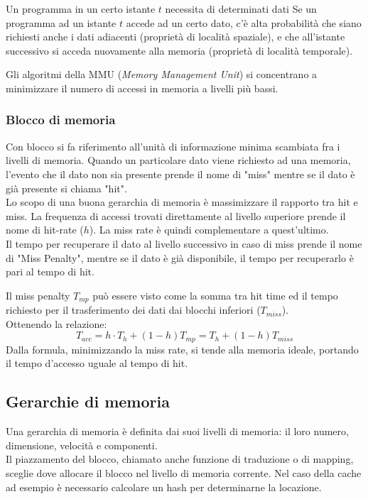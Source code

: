 \documentclass[../template]{subfiles}
\begin{document}
Un programma in un certo istante $t$ necessita di determinati dati
Se un programma ad un istante $t$ accede ad un certo dato,
c'è alta probabilità che siano richiesti anche i dati adiacenti (proprietà di località spaziale), e che all'istante successivo si acceda nuovamente alla memoria (proprietà di località temporale).

Gli algoritmi della MMU (\textit{Memory Management Unit}) si concentrano a minimizzare il numero di accessi in memoria a livelli più bassi.


\subsubsection{Blocco di memoria}
Con blocco si fa riferimento all'unità di informazione minima scambiata fra i livelli di memoria.
Quando un particolare dato viene richiesto ad una memoria, l'evento che il dato non sia presente prende il nome di "miss" mentre se il dato è già presente si chiama "hit".
\\
Lo scopo di una buona gerarchia di memoria è massimizzare il rapporto tra hit e miss.
La frequenza di accessi trovati direttamente al livello superiore prende il nome di hit-rate ($h$).
La miss rate è quindi complementare a quest'ultimo.
\\
Il tempo per recuperare il dato al livello successivo in caso di miss prende il nome di "Miss Penalty", mentre se il dato è già disponibile, il tempo per recuperarlo è pari al tempo di hit.

Il miss penalty $T_{mp}$ può essere visto come la somma tra hit time ed il tempo richiesto per il trasferimento dei dati dai blocchi inferiori ($T_{miss}$).
\\
Ottenendo la relazione:
\[
    T_{acc} = h \cdot T_h + (1-h) T_{mp} = T_h + (1 -h) T_{miss}
\]
Dalla formula, minimizzando la miss rate, si tende alla memoria ideale, portando il tempo d'accesso uguale al tempo di hit.


\subsection{Gerarchie di memoria}
Una gerarchia di memoria è definita dai suoi livelli di memoria: il loro numero, dimensione, velocità e componenti.
\\
Il piazzamento del blocco, chiamato anche funzione di traduzione o di mapping, sceglie dove allocare il blocco nel livello di memoria corrente.  Nel caso della cache ad esempio è necessario calcolare un hash per determinarne la locazione.
\end{document}
